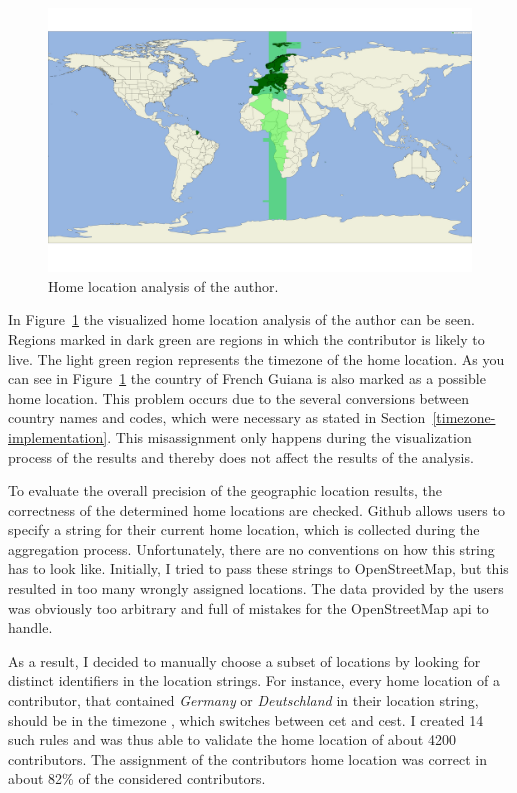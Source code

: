 \begin{figure}[H]
    \includegraphics[scale=0.10]{./graphs/analysis/author-home-location}
    \centering
    \caption{Home location analysis of the author.}\label{fig:author-home-location}
\end{figure}

In Figure~\ref{fig:author-home-location} the visualized home location analysis of the author can be seen.
Regions marked in dark green are regions in which the contributor is likely to live.
The light green region represents the timezone of the home location.
As you can see in Figure~\ref{fig:author-home-location} the country of French Guiana is also marked as a possible home location.
This problem occurs due to the several conversions between country names and codes, which were necessary as stated in Section~\ref{timezone-implementation}.
This misassignment only happens during the visualization process of the results and thereby does not affect the results of the analysis.

To evaluate the overall precision of the geographic location results, the correctness of the determined home locations are checked.
Github allows users to specify a string for their current home location, which is collected during the aggregation process.
Unfortunately, there are no conventions on how this string has to look like.
Initially, I tried to pass these strings to OpenStreetMap, but this resulted in too many wrongly assigned locations.
The data provided by the users was obviously too arbitrary and full of mistakes for the OpenStreetMap \ac{api} to handle.

As a result, I decided to manually choose a subset of locations by looking for distinct identifiers in the location strings.
For instance, every home location of a contributor, that contained \emph{Germany} or \emph{Deutschland} in their location string, should be in the timezone , which switches between \ac{cet} and \ac{cest}.
I created 14 such rules and was thus able to validate the home location of about 4200 contributors.
The assignment of the contributors home location was correct in about 82\% of the considered contributors.

